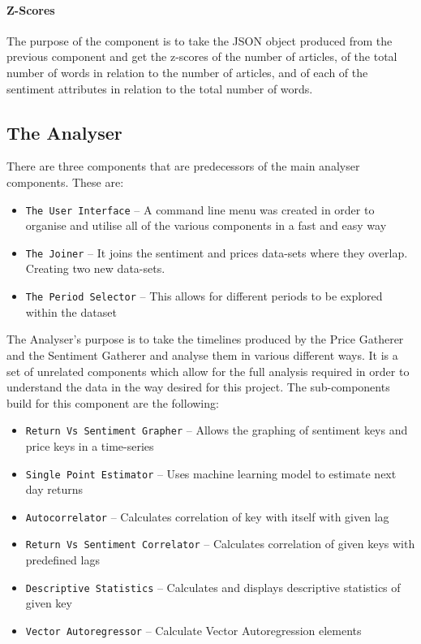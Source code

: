 \paragraph{Z-Scores}

The purpose of the component is to take the JSON object produced from the previous component and get the z-scores of the number of articles, of the total number of words in relation to the number of articles, and of each of the sentiment attributes in relation to the total number of words.

\subsection{The Analyser}

There are three components that are predecessors of the main analyser components. These are:
\begin{itemize}
    \item \texttt{The User Interface} -- A command line menu was created in order to organise and utilise all of the various components in a fast and easy way
    \item \texttt{The Joiner} -- It joins the sentiment and prices data-sets where they overlap. Creating two new data-sets.
    \item \texttt{The Period Selector} -- This allows for different periods to be explored within the dataset
\end{itemize}

The Analyser's purpose is to take the timelines produced by the Price Gatherer and the Sentiment Gatherer and analyse them in various different ways. It is a set of unrelated components which allow for the full analysis required in order to understand the data in the way desired for this project. The sub-components build for this component are the following:
\begin{itemize}
    \item \texttt{Return Vs Sentiment Grapher} -- Allows the graphing of sentiment keys and price keys in a time-series
    \item \texttt{Single Point Estimator} -- Uses machine learning model to estimate next day returns
    \item \texttt{Autocorrelator} -- Calculates correlation of key with itself with given lag
    \item \texttt{Return Vs Sentiment Correlator} -- Calculates correlation of given keys with predefined lags
    \item \texttt{Descriptive Statistics} -- Calculates and displays descriptive statistics of given key
    \item \texttt{Vector Autoregressor} -- Calculate Vector Autoregression elements
\end{itemize}

